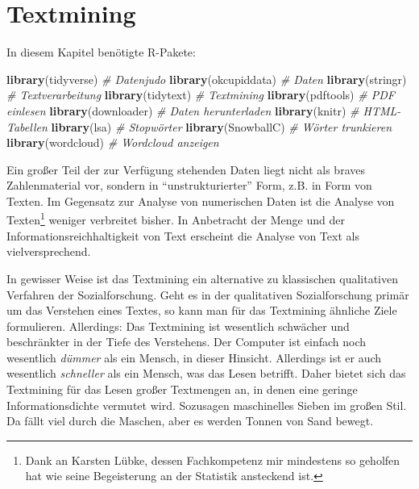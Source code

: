\documentclass[12pt,]{book}
\makeatletter
\newenvironment{Shaded}{\begin{snugshade}}{\end{snugshade}}
\newcommand{\KeywordTok}[1]{\textcolor[rgb]{0.13,0.29,0.53}{\textbf{{#1}}}}
\newcommand{\CommentTok}[1]{\textcolor[rgb]{0.56,0.35,0.01}{\textit{{#1}}}}
\newcommand{\NormalTok}[1]{{#1}}
\newenvironment{kframe}{%
\medskip{}
\setlength{\fboxsep}{.8em}
 \def\at@end@of@kframe{}%
 \ifinner\ifhmode%
  \def\at@end@of@kframe{\end{minipage}}%
  \begin{minipage}{\columnwidth}%
 \fi\fi%
 \def\FrameCommand##1{\hskip\@totalleftmargin \hskip-\fboxsep
 \colorbox{shadecolor}{##1}\hskip-\fboxsep
     \hskip-\linewidth \hskip-\@totalleftmargin \hskip\columnwidth}%
 \MakeFramed {\advance\hsize-\width
   \@totalleftmargin\z@ \linewidth\hsize
   \@setminipage}}%
 {\par\unskip\endMakeFramed%
 \at@end@of@kframe}
\renewenvironment{Shaded}{\begin{kframe}}{\end{kframe}}
\makeatother
\begin{document}
\chapter{Textmining}\label{textmining}

In diesem Kapitel benötigte R-Pakete:

\begin{Shaded}
\begin{Highlighting}[]
\KeywordTok{library}\NormalTok{(tidyverse)  }\CommentTok{# Datenjudo}
\KeywordTok{library}\NormalTok{(okcupiddata)  }\CommentTok{# Daten}
\KeywordTok{library}\NormalTok{(stringr)  }\CommentTok{# Textverarbeitung}
\KeywordTok{library}\NormalTok{(tidytext)  }\CommentTok{# Textmining}
\KeywordTok{library}\NormalTok{(pdftools)  }\CommentTok{# PDF einlesen}
\KeywordTok{library}\NormalTok{(downloader)  }\CommentTok{# Daten herunterladen}
\KeywordTok{library}\NormalTok{(knitr)  }\CommentTok{# HTML-Tabellen}
\KeywordTok{library}\NormalTok{(lsa)  }\CommentTok{# Stopwörter }
\KeywordTok{library}\NormalTok{(SnowballC)  }\CommentTok{# Wörter trunkieren}
\KeywordTok{library}\NormalTok{(wordcloud)  }\CommentTok{# Wordcloud anzeigen}
\end{Highlighting}
\end{Shaded}

Ein großer Teil der zur Verfügung stehenden Daten liegt nicht als braves
Zahlenmaterial vor, sondern in ``unstrukturierter'' Form, z.B. in Form
von Texten. Im Gegensatz zur Analyse von numerischen Daten ist die
Analyse von Texten\footnote{Dank an Karsten Lübke, dessen Fachkompetenz
  mir mindestens so geholfen hat wie seine Begeisterung an der Statistik
  ansteckend ist.} weniger verbreitet bisher. In Anbetracht der Menge
und der Informationsreichhaltigkeit von Text erscheint die Analyse von
Text als vielversprechend.

In gewisser Weise ist das Textmining ein alternative zu klassischen
qualitativen Verfahren der Sozialforschung. Geht es in der qualitativen
Sozialforschung primär um das Verstehen eines Textes, so kann man für
das Textmining ähnliche Ziele formulieren. Allerdings: Das Textmining
ist wesentlich schwächer und beschränkter in der Tiefe des Verstehens.
Der Computer ist einfach noch wesentlich \emph{dümmer} als ein Mensch,
in dieser Hinsicht. Allerdings ist er auch wesentlich \emph{schneller}
als ein Mensch, was das Lesen betrifft. Daher bietet sich das Textmining
für das Lesen großer Textmengen an, in denen eine geringe
Informationsdichte vermutet wird. Sozusagen maschinelles Sieben im
großen Stil. Da fällt viel durch die Maschen, aber es werden Tonnen von
Sand bewegt.
\end{document}
